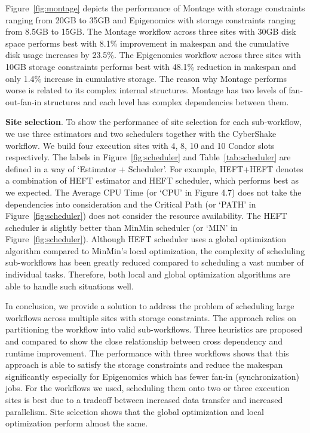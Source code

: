 Figure~\ref{fig:montage} depicts the performance of Montage with storage constraints ranging from 20GB to 35GB and Epigenomics with storage constraints ranging from 8.5GB to 15GB. The Montage workflow across three sites with 30GB disk space performs best with 8.1\% improvement in makespan and the cumulative disk usage increases by 23.5\%. The Epigenomics workflow across three sites with 10GB storage constraints performs best with 48.1\% reduction in makespan and only 1.4\% increase in cumulative storage. The reason why Montage performs worse is related to its complex internal structures. Montage has two levels of fan-out-fan-in structures and each level has complex dependencies between them.

\textbf{Site selection}. To show the performance of site selection for each sub-workflow, we use three estimators and two schedulers  together with the CyberShake workflow. We build four execution sites with 4, 8, 10 and 10 Condor slots respectively. The labels in Figure~\ref{fig:scheduler} and Table~\ref{tab:scheduler} are defined in a way of ‘Estimator + Scheduler’. For example, HEFT+HEFT denotes a combination of HEFT estimator and HEFT scheduler, which performs best as we expected. The Average CPU Time (or ‘CPU’ in Figure 4.7) does not take the dependencies into consideration and the Critical Path (or ‘PATH’ in Figure~\ref{fig:scheduler}) does not consider the resource availability. The HEFT scheduler is slightly better than MinMin scheduler (or ‘MIN’ in Figure~\ref{fig:scheduler}). Although HEFT scheduler uses a global optimization algorithm compared to MinMin’s local optimization, the complexity of scheduling sub-workflows has been greatly reduced compared to scheduling a vast number of individual tasks. Therefore, both local and global optimization algorithms are able to handle such situations well.

In conclusion, we provide a solution to address the problem of scheduling large workflows across multiple sites with storage constraints. The approach relies on partitioning the workflow into valid sub-workflows. Three heuristics are proposed and compared to show the close relationship between cross dependency and runtime improvement. The performance with three workflows shows that this approach is able to satisfy the storage constraints and reduce the makespan significantly especially for Epigenomics which has fewer fan-in (synchronization) jobs. For the workflows we used, scheduling them onto two or three execution sites is best due to a tradeoff between increased data transfer and increased parallelism. Site selection shows that the global optimization and local optimization perform almost the same.  

